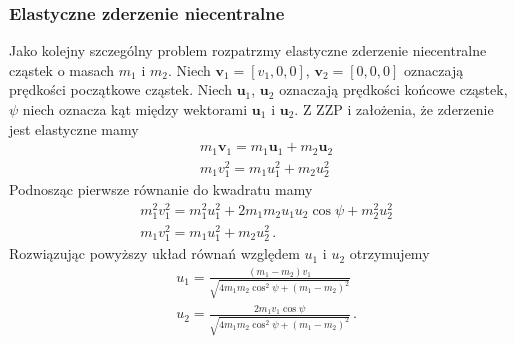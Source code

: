 \documentclass[../main.tex]{subfiles}
\begin{document}
\subsubsection*{Elastyczne zderzenie niecentralne}
Jako kolejny szczególny problem rozpatrzmy elastyczne zderzenie niecentralne cząstek o masach
\(m_1\) i \(m_2\). Niech \(\mathbf{v}_1=[v_1,0,0]\), \(\mathbf{v}_2=[0,0,0]\) oznaczają prędkości
początkowe cząstek. Niech \(\mathbf{u}_1\), \(\mathbf{u}_2\) oznaczają prędkości końcowe cząstek,
\(\psi\) niech oznacza kąt między wektorami \(\mathbf{u}_1\) i \(\mathbf{u}_2\). Z ZZP i założenia,
że zderzenie jest elastyczne mamy
\begin{equation*}
\begin{split}
    &m_1\mathbf{v}_1=m_1\mathbf{u}_1+m_2\mathbf{u}_2\\
    &m_1v_1^2=m_1u_1^2+m_2u_2^2
\end{split}
\end{equation*}
Podnosząc pierwsze równanie do kwadratu mamy
\begin{equation*}
\begin{split}
     &m_1^2v_1^2=m_1^2u_1^2+2m_1m_2u_1u_2\cos\psi+m_2^2u_2^2\\
     &m_1v_1^2=m_1u_1^2+m_2u_2^2\,.
\end{split}
\end{equation*}
Rozwiązując powyższy układ równań względem \(u_1\) i \(u_2\) otrzymujemy
\begin{equation*}
\begin{split}
     &u_1=\frac{(m_1-m_2)v_1}{\sqrt{4m_1m_2\cos^2\psi+(m_1-m_2)^2}}\\
     &u_2=\frac{2m_1v_1\cos\psi}{\sqrt{4m_1m_2\cos^2\psi+(m_1-m_2)^2}}\,.
\end{split}
\end{equation*}
\end{document}
